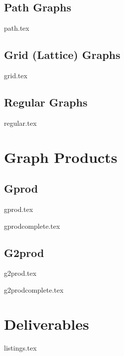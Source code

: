 \documentclass{amsart}
\begin{document}
    \subsection{Path Graphs}
        {path.tex}
        
    \subsection{Grid (Lattice) Graphs}
        {grid.tex}
        
    \subsection{Regular Graphs}
        {regular.tex}

\section{Graph Products}

    \subsection{Gprod}
        {gprod.tex}
        
        {gprodcomplete.tex}
    
    \subsection{G2prod}
        {g2prod.tex}
        
        {g2prodcomplete.tex}
    
\section{Deliverables}

    {listings.tex}
\end{document}

